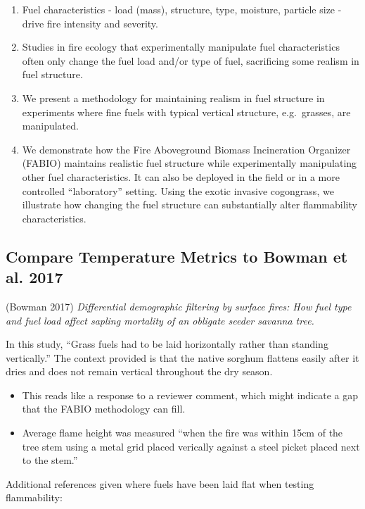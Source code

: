 \documentclass[11pt,a4paper]{article}
\begin{document}
\begin{enumerate}
\def\labelenumi{\arabic{enumi}.}
\item
  Fuel characteristics - load (mass), structure, type, moisture,
  particle size - drive fire intensity and severity.
\item
  Studies in fire ecology that experimentally manipulate fuel
  characteristics often only change the fuel load and/or type of fuel,
  sacrificing some realism in fuel structure.
\item
  We present a methodology for maintaining realism in fuel structure in
  experiments where fine fuels with typical vertical structure,
  e.g.~grasses, are manipulated.
\item
  We demonstrate how the Fire Aboveground Biomass Incineration Organizer
  (FABIO) maintains realistic fuel structure while experimentally
  manipulating other fuel characteristics. It can also be deployed in
  the field or in a more controlled ``laboratory'' setting. Using the
  exotic invasive cogongrass, we illustrate how changing the fuel
  structure can substantially alter flammability characteristics.
\end{enumerate}

\subsection{Compare Temperature Metrics to Bowman et al.
2017}\label{compare-temperature-metrics-to-bowman-et-al.-2017}

(Bowman 2017) \emph{Differential demographic filtering by surface fires:
How fuel type and fuel load affect sapling mortality of an obligate
seeder savanna tree.}

In this study, ``Grass fuels had to be laid horizontally rather than
standing vertically.'' The context provided is that the native sorghum
flattens easily after it dries and does not remain vertical throughout
the dry season.

\begin{itemize}
\item
  This reads like a response to a reviewer comment, which might indicate
  a gap that the FABIO methodology can fill.
\item
  Average flame height was measured ``when the fire was within 15cm of
  the tree stem using a metal grid placed verically against a steel
  picket placed next to the stem.''
\end{itemize}

Additional references given where fuels have been laid flat when testing
flammability:
\end{document}
